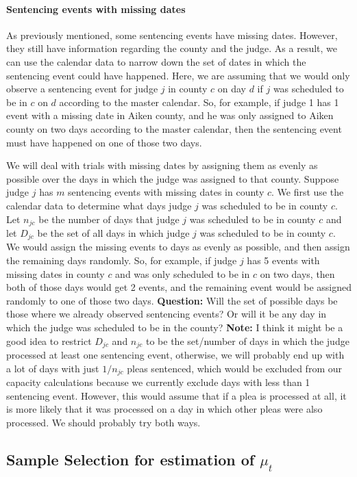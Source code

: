 \documentclass[11pt]{article}
\theoremstyle{ModifiedStyle}
\theoremstyle{ModifiedStyle}
\begin{document}
    \paragraph{Sentencing events with missing dates}
      As previously mentioned, some sentencing events have missing dates. However, they still have information regarding the county and the judge. As a result, we can use the calendar data to narrow down the set of dates in which the sentencing event could have happened. Here, we are assuming that we would only observe a sentencing event for judge $j$ in county $c$ on day $d$ if $j$ was scheduled to be in $c$ on $d$ according to the master calendar. So, for example, if judge 1 has 1 event with a missing date in Aiken county, and he was only assigned to Aiken county on two days according to the master calendar, then the sentencing event must have happened on one of those two days.

      We will deal with trials with missing dates by assigning them as evenly as possible over the days in which the judge was assigned to that county. Suppose judge $j$ has $m$ sentencing events with missing dates in county $c$. We first use the calendar data to determine what days judge $j$ was scheduled to be in county $c$. Let $n_{jc}$ be the number of days that judge $j$ was scheduled to be in county $c$ and let $D_{jc}$ be the set of all days in which judge $j$ was scheduled to be in county $c$. We would assign the missing events to days as evenly as possible, and then assign the remaining days randomly. So, for example, if judge $j$ has 5 events with missing dates in county $c$ and was only scheduled to be in $c$ on two days, then both of those days would get 2 events, and the remaining event would be assigned randomly to one of those two days. \textbf{Question:} Will the set of possible days be those where we already observed sentencing events? Or will it be any day in which the judge was scheduled to be in the county? \textbf{Note:} I think it might be a good idea to restrict $D_{jc}$ and $n_{jc}$ to be the set/number of days in which the judge processed at least one sentencing event, otherwise, we will probably end up with a lot of days with just $1/n_{jc}$ pleas sentenced, which would be excluded from our capacity calculations because we currently exclude days with less than 1 sentencing event. However, this would assume that if a plea is processed at all, it is more likely that it was processed on a day in which other pleas were also processed. We should probably try both ways.

  \subsection{Sample Selection for estimation of $\mu_t$}
\end{document}
